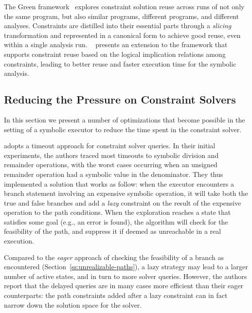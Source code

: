 The Green framework~\cite{GREEN-FSE12} explores constraint solution reuse across runs of not only the same program, but also similar programs, different programs, and different analyses. Constraints are distilled into their essential parts through a {\em slicing} transformation and represented in a canonical form to achieve good reuse, even within a single analysis run. ~\cite{JGY-ISSTA15} presents an extension to the framework that supports constraint reuse based on the logical implication relations among constraints, leading to better reuse and faster execution time for the symbolic analysis.

\subsection{Reducing the Pressure on Constraint Solvers}
\label{ss:reducing-constraint-solver-pressure}

In this section we present a number of optimizations that become possible in the setting of a symbolic executor to reduce the time spent in the constraint solver.

\cite{UCKLEE-USEC15} adopts a timeout approach for constraint solver queries. In their initial experiments, the authors traced most timeouts to symbolic division and remainder operations, with the worst cases occurring when an unsigned remainder operation had a symbolic value in the denominator.
They thus implemented a solution that works as follow: when the executor encounters a branch statement involving an expensive symbolic operation, it will take both the true and false branches and add a {\em lazy} constraint on the result of the expensive operation to the path conditions. When the exploration reaches a state that satisfies some goal (e.g., an error is found), the algorithm will check for the feasibility of the path, and suppress it if deemed as unreachable in a real execution.

Compared to the {\em eager} approach of checking the feasibility of a branch as encountered (Section~\ref{ss:unrealizable-paths}), a lazy strategy may lead to a larger number of active states, and in turn to more solver queries. However, the authors report that the delayed queries are in many cases more efficient than their eager counterparts: the path constraints added after a lazy constraint can in fact narrow down the solution space for the solver.

